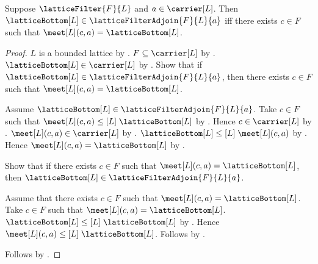 \begin{theorem}\label{lattice_filter_adjoin_bottom_iff}
    Suppose $\latticeFilter{F}{L}$ and $a\in\carrier[L]$.
    Then $\latticeBottom[L]\in\latticeFilterAdjoin{F}{L}{a}$ iff
        there exists $c\in F$ such that
            $\meet[L](c,a)=\latticeBottom[L]$.
\end{theorem}
\begin{proof}
    $L$ is a bounded lattice by .
    $F\subseteq\carrier[L]$ by
        .
    $\latticeBottom[L]\in\carrier[L]$ by
        .
    Show that if
        $\latticeBottom[L]\in\latticeFilterAdjoin{F}{L}{a}$,
        then there exists $c\in F$ such that
            $\meet[L](c,a)=\latticeBottom[L]$.
    \begin{subproof}
        Assume $\latticeBottom[L]\in
            \latticeFilterAdjoin{F}{L}{a}$.
        Take $c\in F$ such that
            $\meet[L](c,a)\mathrel{\leq[L]}\latticeBottom[L]$ by
            .
        Hence $c\in\carrier[L]$ by .
        $\meet[L](c,a)\in\carrier[L]$ by .
        $\latticeBottom[L]\mathrel{\leq[L]}\meet[L](c,a)$ by
            .
        Hence $\meet[L](c,a)=\latticeBottom[L]$ by
            .
    \end{subproof}
    Show that if there exists $c\in F$ such that
        $\meet[L](c,a)=\latticeBottom[L]$, then
        $\latticeBottom[L]\in\latticeFilterAdjoin{F}{L}{a}$.
    \begin{subproof}
        Assume that there exists $c\in F$ such that
            $\meet[L](c,a)=\latticeBottom[L]$.
        Take $c\in F$ such that
            $\meet[L](c,a)=\latticeBottom[L]$.
        $\latticeBottom[L]\mathrel{\leq[L]}\latticeBottom[L]$ by
            .
        Hence $\meet[L](c,a)
            \mathrel{\leq[L]}\latticeBottom[L]$.
        Follows by .
    \end{subproof}
    Follows by \auto.
\end{proof}

